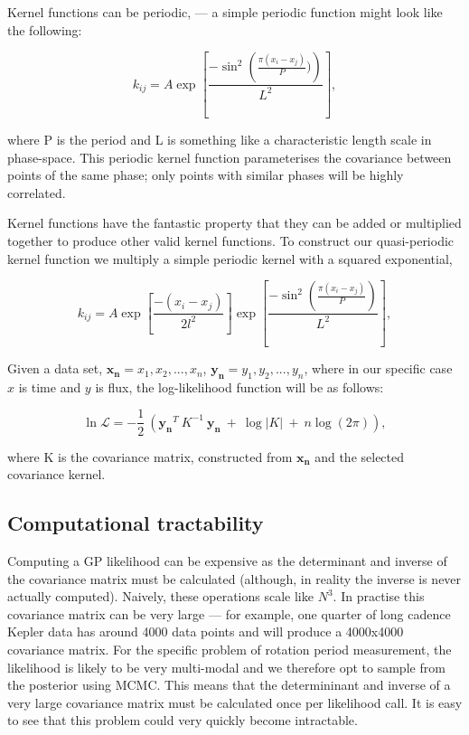 \documentclass[12pt,preprint]{aastex}
\begin{document}
Kernel functions can be periodic,  --- a simple periodic function might look like the following:

\begin{equation}
	k_{ij} = A\exp\left[{\frac{-\sin^2\left({\frac{\pi(x_i-x_j)}{P})}\right)}{L^2}}\right],
\end{equation}

where P is the period and L is something like a characteristic length scale in phase-space.
This periodic kernel function parameterises the covariance between points of the same phase; only points with similar phases will be highly correlated.

Kernel functions have the fantastic property that they can be added or multiplied together to produce other valid kernel functions.
To construct our quasi-periodic kernel function we multiply a simple periodic kernel with a squared exponential,

\begin{equation}
	k_{ij} = A\exp\left[{\frac{-(x_i-x_j)}{2l^2}}\right]\exp\left[\frac{-\sin^2\left(\frac{\pi(x_i-x_j)}{P}\right)}{L^2}\right],
\end{equation}

Given a data set, $\mathbf{x_n} = {x_1, x_2, ..., x_n}$, $\mathbf{y_n} = {y_1, y_2, ..., y_n}$, where in our specific case $x$ is time and $y$ is flux, the log-likelihood function will be as follows:

\begin{equation}
	\ln{\mathcal{L}} = -\frac{1}{2}~\left(\mathbf{y_n}^T~K^{-1}~\mathbf{y_n}~ + ~\log{|K| ~+~ n\log(2\pi)} \right),
\end{equation}

where K is the covariance matrix, constructed from $\mathbf{x_n}$ and the selected covariance kernel.

\subsection{Computational tractability}

Computing a GP likelihood can be expensive as the determinant and inverse of the covariance matrix must be calculated (although, in reality the inverse is never actually computed).
Naively, these operations scale like $N^3$.
In practise this covariance matrix can be very large --- for example, one quarter of long cadence Kepler data has around 4000 data points and will produce a 4000x4000 covariance matrix.
For the specific problem of rotation period measurement, the likelihood is likely to be very multi-modal and we therefore opt to sample from the posterior using MCMC.
This means that the determininant and inverse of a very large covariance matrix must be calculated once per likelihood call.
It is easy to see that this problem could very quickly become intractable.
\end{document}
